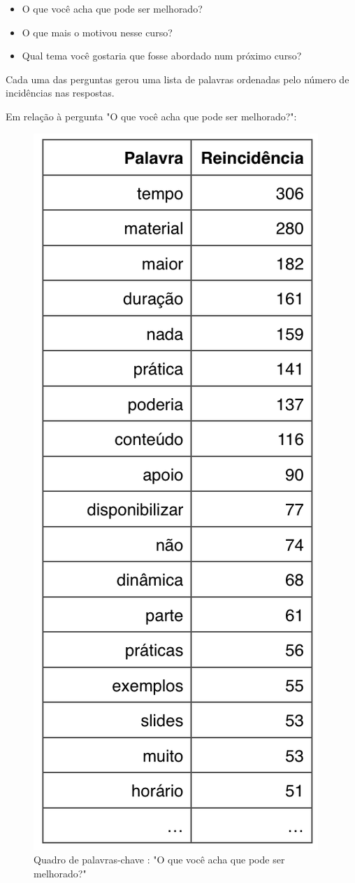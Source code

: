 \begin{itemize}
\item O que você acha que pode ser melhorado?
\item O que mais o motivou nesse curso?
\item Qual tema você gostaria que fosse abordado num próximo curso?
\end{itemize}

Cada uma das perguntas gerou uma lista de palavras ordenadas pelo número de incidências nas respostas.


Em relação à pergunta "O que você acha que pode ser melhorado?":

\begin{figure}[H]
\caption{Quadro de palavras-chave : "O que você acha que pode ser melhorado?"}
\centerline{\includegraphics[scale=0.75]{img/melhoriastopn}}

\end{figure}

